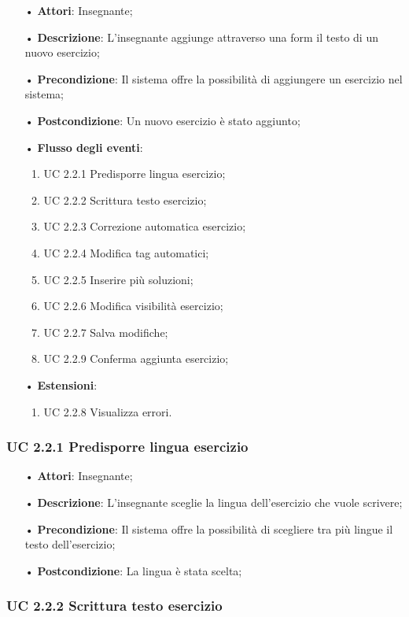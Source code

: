 \begin{itemize}
	\item[•] \textbf{Attori}: Insegnante;
	\item[•] \textbf{Descrizione}: L'insegnante aggiunge attraverso una form il testo di un nuovo esercizio;
	\item[•] \textbf{Precondizione}: Il sistema offre la possibilità di aggiungere un esercizio nel sistema;
	\item[•] \textbf{Postcondizione}: Un nuovo esercizio è stato aggiunto;
	\item[•] \textbf{Flusso degli eventi}:
	\begin{enumerate}
		\item UC 2.2.1 Predisporre lingua esercizio;
		\item UC 2.2.2 Scrittura testo esercizio;
		\item UC 2.2.3 Correzione automatica esercizio;
		\item UC 2.2.4 Modifica {tag} automatici;
		\item UC 2.2.5 Inserire più soluzioni;
		\item UC 2.2.6 Modifica visibilità esercizio;
		\item UC 2.2.7 Salva modifiche;
		\item UC 2.2.9 Conferma aggiunta esercizio;
	\end{enumerate}
	\item[•] \textbf{Estensioni}:	
	\begin{enumerate}
		\item UC 2.2.8 Visualizza errori.
	\end{enumerate}
\end{itemize}
\subsubsection{UC 2.2.1 Predisporre lingua esercizio}
\begin{itemize}
	\item[•] \textbf{Attori}: Insegnante;
	\item[•] \textbf{Descrizione}: L'insegnante sceglie la lingua dell’esercizio che vuole scrivere;
	\item[•] \textbf{Precondizione}: Il sistema offre la possibilità di scegliere tra più lingue il testo dell’esercizio;
	\item[•] \textbf{Postcondizione}: La lingua è stata scelta;
\end{itemize}
\subsubsection{UC 2.2.2 Scrittura testo esercizio}

